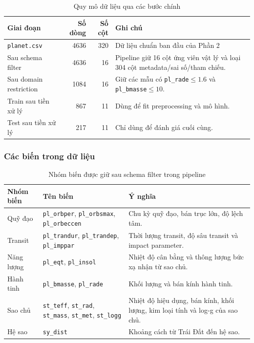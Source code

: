 \begin{table}[H]
\centering
\caption{Quy mô dữ liệu qua các bước chính}
\label{tab:part2_data_size}
\begin{tabular}{@{}lrrp{}@{}}
\hline
\textbf{Giai đoạn} & \textbf{Số dòng} & \textbf{Số cột} & \textbf{Ghi chú} \\
\hline
\texttt{planet.csv} & 4636 & 320 & Dữ liệu chuẩn ban đầu của Phần 2 \\
Sau schema filter & 4636 & 16 & Pipeline giữ 16 cột ứng viên vật lý và loại 304 cột metadata/sai số/tham chiếu. \\
Sau domain restriction & 1084 & 16 & Giữ các mẫu có \texttt{pl\_rade}$\le1.6$ và \texttt{pl\_bmasse}$\le10$. \\
Train sau tiền xử lý & 867 & 11 & Dùng để fit preprocessing và mô hình. \\
Test sau tiền xử lý & 217 & 11 & Chỉ dùng để đánh giá cuối cùng. \\
\hline
\end{tabular}
\end{table}

\subsubsection{Các biến trong dữ liệu}

\begin{table}[H]
\centering
\caption{Nhóm biến được giữ sau schema filter trong pipeline}
\label{tab:part2_variables}
\begin{tabular}{@{}p{}p{}p{}@{}}
\hline
\textbf{Nhóm biến} & \textbf{Tên biến} & \textbf{Ý nghĩa} \\
\hline
Quỹ đạo & \texttt{pl\_orbper}, \texttt{pl\_orbsmax}, \texttt{pl\_orbeccen}
& Chu kỳ quỹ đạo, bán trục lớn, độ lệch tâm. \\
Transit & \texttt{pl\_trandur}, \texttt{pl\_trandep}, \texttt{pl\_imppar}
& Thời lượng transit, độ sâu transit và impact parameter. \\
Năng lượng & \texttt{pl\_eqt}, \texttt{pl\_insol}
& Nhiệt độ cân bằng và thông lượng bức xạ nhận từ sao chủ. \\
Hành tinh & \texttt{pl\_bmasse}, \texttt{pl\_rade}
& Khối lượng và bán kính hành tinh. \\
Sao chủ & \texttt{st\_teff}, \texttt{st\_rad}, \texttt{st\_mass}, \texttt{st\_met}, \texttt{st\_logg}
& Nhiệt độ hiệu dụng, bán kính, khối lượng, kim loại tính và log-g của sao chủ. \\
Hệ sao & \texttt{sy\_dist}
& Khoảng cách từ Trái Đất đến hệ sao. \\
\hline
\end{tabular}
\end{table}

